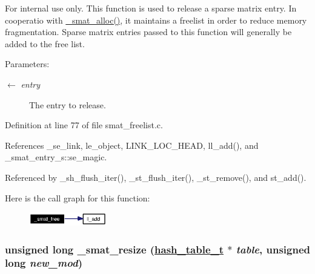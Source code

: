 \begin{Desc}
\item[For internal use only.]
This function is used to release a sparse matrix entry. In cooperatio with \hyperlink{group__dbprim__smat_ga24}{\_\-smat\_\-alloc()}, it maintains a freelist in order to reduce memory fragmentation. Sparse matrix entries passed to this function will generally be added to the free list.

\begin{Desc}
\item[Parameters:]
\begin{description}
\item[\mbox{$\leftarrow$} {\em entry}]The entry to release.\end{description}
\end{Desc}
\end{Desc}


Definition at line 77 of file smat\_\-freelist.c.

References \_\-se\_\-link, le\_\-object, LINK\_\-LOC\_\-HEAD, ll\_\-add(), and \_\-smat\_\-entry\_\-s::se\_\-magic.

Referenced by \_\-sh\_\-flush\_\-iter(), \_\-st\_\-flush\_\-iter(), \_\-st\_\-remove(), and st\_\-add().

Here is the call graph for this function:\begin{figure}[H]
\begin{center}
\leavevmode
\includegraphics[width=96pt]{group__dbprim__smat_ga25_cgraph}
\end{center}
\end{figure}
\hypertarget{group__dbprim__smat_ga26}{
\subsubsection[\_\-smat\_\-resize]{\setlength{\rightskip}{0pt plus 5cm}unsigned long \_\-smat\_\-resize (\hyperlink{struct__hash__table__s}{hash\_\-table\_\-t} $\ast$ {\em table}, unsigned long {\em new\_\-mod})}}
\label{group__dbprim__smat_ga26}


